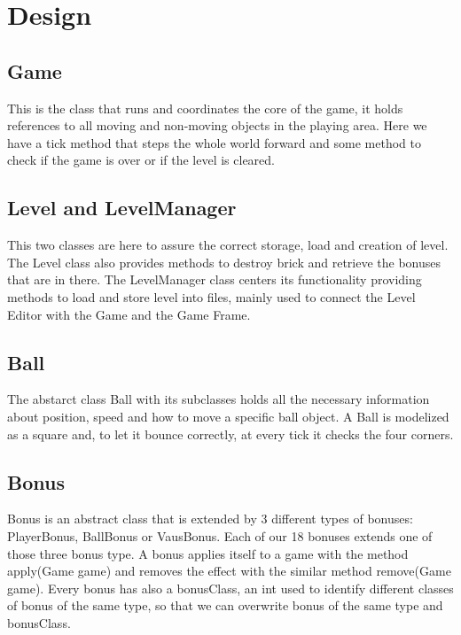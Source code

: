 \chapter*{Design}
\label{cha:design}

\section*{Game}
\label{sec:game}
This is the class that runs and coordinates the core of the game, it holds references to all moving and non-moving objects in the playing area. Here we have a tick method that steps the whole world forward and some method to check if the game is over or if the level is cleared.

\section*{Level and LevelManager}
\label{sec:level}
This two classes are here to assure the correct storage, load and creation of level. The Level class also provides methods to destroy brick and retrieve the bonuses that are in there. The LevelManager class centers its functionality providing methods to load and store level into files, mainly used to connect the Level Editor with the Game and the Game Frame.

\section*{Ball}
\label{sec:ball}
The abstarct class Ball with its subclasses holds all the necessary information about position, speed and how to move a specific ball object. A Ball is modelized as a square and, to let it bounce correctly, at every tick it checks the four corners.

\section*{Bonus}
\label{sec:bonus}
Bonus is an abstract class that is extended by 3 different types of bonuses: PlayerBonus, BallBonus or VausBonus. Each of our 18 bonuses extends one of those three bonus type. A bonus applies itself to a game with the method apply(Game game) and removes the effect with the similar method remove(Game game). Every bonus has also a bonusClass, an int used to identify different classes of bonus of the same type, so that we can overwrite bonus of the same type and bonusClass.

